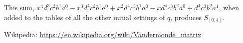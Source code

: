 \documentclass[11pt, oneside]{article} 	%
\begin{document}
This sum, $x^4d^3c^2b^1a^0-x^3d^4c^2b^1a^0+x^2d^4c^3b^1a^0-xd^4c^3b^2a^0+d^4c^3b^2a^1$, when added to the tables of all the other initial settings of $q$, produces $S_{[0,4]}$.


\begin{thebibliography}{9}
Wikipedia: \url{https://en.wikipedia.org/wiki/Vandermonde_matrix}
\end{thebibliography}
\end{document}
